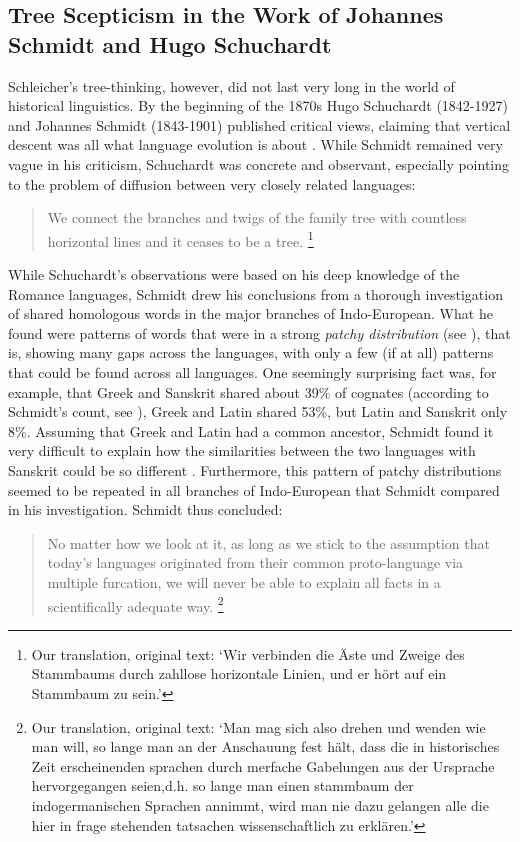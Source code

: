 \documentclass[svgnames,12pt]{scrartcl}
\begin{document}
{\subsection{Tree Scepticism in the Work of Johannes Schmidt and Hugo Schuchardt}
Schleicher's tree-thinking, however, did not last very long in the world of historical linguistics.
By the beginning of the 1870s Hugo Schuchardt (1842-1927) and Johannes Schmidt (1843-1901) published
critical views, claiming that vertical descent was all what language evolution is about
\citep{Schmidt1872,Schuchardt1870}. While Schmidt remained very vague in his criticism, Schuchardt
was concrete and observant, especially pointing to the problem of diffusion
between very closely related languages: 

\begin{quote}
\small We connect the branches and twigs of the family tree with countless horizontal lines and it ceases
to be a tree. \citep[9]{Schuchardt1870}\footnote{Our translation, original text: `Wir verbinden die
Äste und Zweige des Stammbaums durch zahllose horizontale Linien, und er hört auf ein Stammbaum zu
sein.'} 
\end{quote}

While Schuchardt's observations were based on his deep knowledge of the Romance languages, Schmidt
drew his conclusions from a thorough investigation of shared homologous words in the major branches
of Indo-European. What he found were patterns of words that were in a strong \emph{patchy
distribution} (see \citealt{List2014a}), that is, showing many gaps across the languages, with only
a few (if at all) patterns that could be found across all languages. One seemingly surprising fact
was, for example, that Greek and Sanskrit shared about 39\% of cognates (according to Schmidt's
count, see \citealt{Geisler2013}), Greek and Latin shared 53\%, but Latin and Sanskrit only 8\%.
Assuming that Greek and Latin had a common ancestor, Schmidt found it very difficult to explain how
the similarities between the two languages with Sanskrit could be so different
\citep[24]{Schmidt1872}. Furthermore, this pattern of patchy distributions seemed to be repeated in
all branches of Indo-European that Schmidt compared in his investigation. Schmidt thus concluded: 

\begin{quote}
     \small No matter how we look at it, as long as we stick to the assumption that today's languages
     originated from their common proto-language via multiple furcation, we will never be able to
     explain all facts in a scientifically adequate way. \citep[17]{Schmidt1872}\footnote{Our
     translation, original text: `Man mag sich also drehen und wenden wie man will, so lange man an
     der Anschauung fest hält, dass die in historisches Zeit erscheinenden sprachen durch merfache
     Gabelungen aus der Ursprache hervorgegangen seien,d.h. so lange man einen stammbaum der
     indogermanischen Sprachen annimmt, wird man nie dazu gelangen alle die hier in frage stehenden
     tatsachen wissenschaftlich zu erklären.'} 
\end{quote}

}
\end{document}
